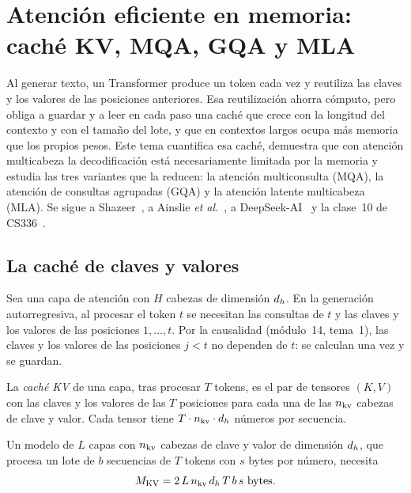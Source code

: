 \chapter{Atención eficiente en memoria: caché KV, MQA, GQA y MLA}
\label{tema:2}

Al generar texto, un Transformer produce un token cada vez y reutiliza las claves y los valores de las posiciones anteriores. Esa reutilización ahorra cómputo, pero obliga a guardar y a leer en cada paso una caché que crece con la longitud del contexto y con el tamaño del lote, y que en contextos largos ocupa más memoria que los propios pesos. Este tema cuantifica esa caché, demuestra que con atención multicabeza la decodificación está necesariamente limitada por la memoria y estudia las tres variantes que la reducen: la atención multiconsulta (MQA), la atención de consultas agrupadas (GQA) y la atención latente multicabeza (MLA). Se sigue a Shazeer~\cite[§2.4 y §3]{mqa}, a Ainslie \emph{et al.}~\cite[§2]{gqa}, a DeepSeek-AI~\cite[§2.1]{deepseekv2} y la clase~10 de CS336~\cite{cs336}.

\section{La caché de claves y valores}

Sea una capa de atención con $H$ cabezas de dimensión $d_{h}$. En la generación autorregresiva, al procesar el token $t$ se necesitan las consultas de $t$ y las claves y los valores de las posiciones $1,\dots,t$. Por la causalidad (módulo~14, tema~1), las claves y los valores de las posiciones $j<t$ no dependen de $t$: se calculan una vez y se guardan.

\begin{definicion}[Caché KV]\label{def:cache}
La \emph{caché KV} de una capa, tras procesar $T$ tokens, es el par de tensores $(K,V)$ con las claves y los valores de las $T$ posiciones para cada una de las $n_{\mathrm{kv}}$ cabezas de clave y valor. Cada tensor tiene $T\cdot n_{\mathrm{kv}}\cdot d_{h}$ números por secuencia.
\end{definicion}

\begin{proposicion}\label{prop:cache}
Un modelo de $L$ capas con $n_{\mathrm{kv}}$ cabezas de clave y valor de dimensión $d_{h}$, que procesa un lote de $b$ secuencias de $T$ tokens con $s$ bytes por número, necesita
\[
M_{\mathrm{KV}}=2\,L\,\nkv\,\dhd\,T\,b\,s\ \text{bytes}.
\]
\end{proposicion}

